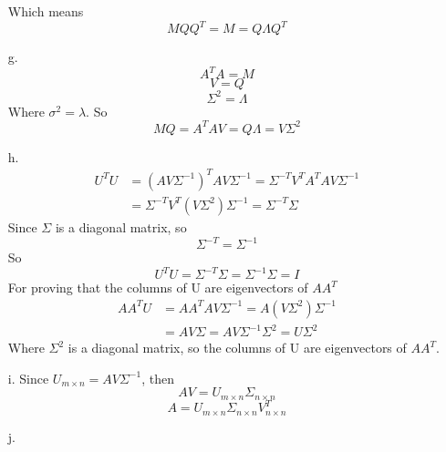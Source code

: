 \documentclass[10pt]{article}
\begin{document}
\begin{enumerate}
Which means \\
\begin{equation}
MQQ^T=M=Q\Lambda Q^T
\end{equation}
\item[g.]
\begin{equation}
A^TA=M
\end{equation}
\begin{equation}
V=Q
\end{equation}
\begin{equation}
\Sigma^2=\Lambda
\end{equation}
Where $\sigma^2=\lambda$.
So \\
\begin{equation}
MQ=A^TAV=Q\Lambda=V\Sigma^2
\end{equation}
\item[h.]
\begin{equation}
\begin{aligned}
U^TU&=(AV\Sigma^{-1})^TAV\Sigma^{-1}=\Sigma^{-T}V^TA^TAV\Sigma^{-1} \\
&=\Sigma^{-T}V^T(V\Sigma^2)\Sigma^{-1}=\Sigma^{-T}\Sigma
\end{aligned}
\end{equation}
Since $\Sigma$ is a diagonal matrix, so \\
\begin{equation}
\Sigma^{-T}=\Sigma^{-1}
\end{equation}
So \\
\begin{equation}
U^TU=\Sigma^{-T}\Sigma=\Sigma^{-1}\Sigma=I
\end{equation}
For proving that the columns of U are eigenvectors of $AA^T$ \\
\begin{equation}
\begin{aligned}
AA^TU&=AA^TAV\Sigma^{-1}=A(V\Sigma^2)\Sigma^{-1} \\
&=AV\Sigma=AV\Sigma^{-1}\Sigma^2=U\Sigma^2
\end{aligned}
\end{equation}
Where $\Sigma^2$ is a diagonal matrix, so the columns of U are eigenvectors of $AA^T$. \\
\item[i.]
Since $U_{m\times n}=AV\Sigma^{-1}$, then \\
\begin{equation}
AV=U_{m\times n}\Sigma_{n\times n}
\end{equation}
\begin{equation}
A=U_{m\times n}\Sigma_{n\times n}V_{n\times n}^T
\end{equation}
\item[j.]
\end{enumerate}
\end{document}
